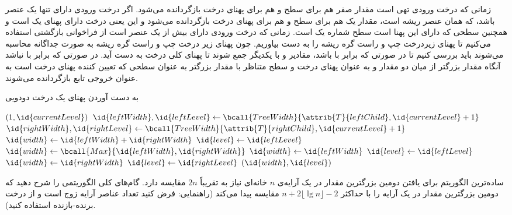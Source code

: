 زمانی که درخت ورودی تهی است مقدار صفر هم برای سطح و هم برای پهنای درخت بازگردانده می‌شود. اگر درخت ورودی دارای تنها یک عنصر باشد، که همان عنصر ریشه است، مقدار یک هم برای سطح و هم برای پهنای درخت بازگردانده می‌شود و این یعنی درخت دارای پهنای یک است و همچنین سطحی که دارای این پهنا است سطح شماره یک است. زمانی که درخت ورودی دارای بیش از یک عنصر است از فراخوانی بازگشتی استفاده می‌کنیم تا پهنای زیردرخت چپ و راست گره ریشه را به دست بیاوریم. چون پهنای زیر درخت چپ و راست گره ریشه به صورت جداگانه محاسبه می‌شوند باید بررسی کنیم تا در صورتی که {} برابر با {} باشد، مقادیر {} و {} با یکدیگر جمع شوند تا پهنای کلی درخت به دست آید. در صورتی که {} برابر با {} نباشد آنگاه مقدار بزرگتر از میان دو مقدار {} و {} به عنوان پهنای درخت و سطح متناظر با مقدار بزرگتر به عنوان سطحی که تعیین کننده پهنای درخت است به عنوان خروجی تابع بازگردانده می‌شوند.

\begin{algorithm}
\caption{به دست آوردن پهنای یک درخت دودویی}\label{ch5:alg:treeWidth}
\begin{latin}
\begin{algorithmic}[1]
			\State	\Return $(1,\id{currentLevel})$
		\EndIf
		\State	$\id{leftWidth},\id{leftLevel} \gets \bcall{TreeWidth}{\attrib{T}{leftChild},\id{currentLevel}+1}$
		\State	$\id{rightWidth},\id{rightLevel} \gets \bcall{TreeWidth}{\attrib{T}{rightChild},\id{currentLevel}+1}$
			\State	$\id{width} \gets \id{leftWidth}+\id{rightWidth}$
			\State	$\id{level} \gets \id{leftLevel}$
		\Else
			\State	$\id{width} \gets \bcall{Max}{\id{leftWidth},\id{rightWidth}}$
				\State	$\id{width} \gets \id{leftWidth}$
				\State	$\id{level} \gets \id{leftLevel}$
			\Else			
				\State	$\id{width} \gets \id{rightWidth}$			
				\State	$\id{level} \gets \id{rightLevel}$
			\EndIf
		\EndIf
		\State	\Return	$(\id{width},\id{level})$
\EndFunction
\end{algorithmic}
\end{latin}
\end{algorithm}

 ساده‌ترین الگوریتم برای یافتن دومین بزرگترین مقدار در یک آرایه‌ی {$n$} خانه‌ای نیاز به تقریباً {$2n$} مقایسه دارد. گام‌های کلی الگوریتمی را شرح دهید که دومین بزرگترین مقدار در یک آرایه را با حداکثر {$n+2\lfloor \lg n \rfloor - 2$} مقایسه پیدا می‌کند (راهنمایی: فرض کنید تعداد عناصر آرایه زوج است و از درخت‌ برنده-بازنده استفاده کنید).

